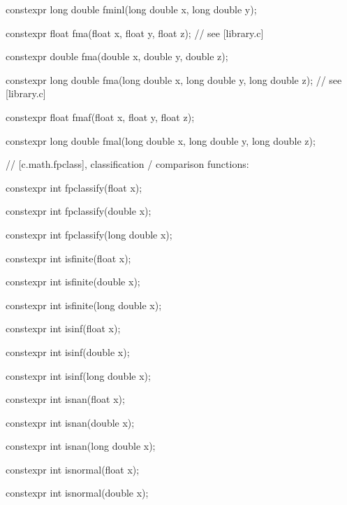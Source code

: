 \documentclass[prd,twocolumn,amsmath,amssymb,nofootinbib,eqsecnum]{revtex4-1}
\newcommand{\highlight}[1]{{\color{red} #1}}
\begin{document}
\begin{widetext}
{\highlight{constexpr} long double fminl(long double x, long double y);

\vspace{2ex}

\highlight{constexpr}  float fma(float x, float y, float z); // see [library.c]

\highlight{constexpr}  double fma(double x, double y, double z);

\highlight{constexpr}  long double fma(long double x, long double y, long double z); // see [library.c]

\highlight{constexpr}  float fmaf(float x, float y, float z);

\highlight{constexpr}  long double fmal(long double x, long double y, long double z);

\vspace{2ex}

// [c.math.fpclass], classification / comparison functions:

\highlight{constexpr} int fpclassify(float x);

\highlight{constexpr} int fpclassify(double x);

\highlight{constexpr} int fpclassify(long double x);

\vspace{2ex}

\highlight{constexpr} int isfinite(float x);

\highlight{constexpr} int isfinite(double x);

\highlight{constexpr} int isfinite(long double x);

\vspace{2ex}

\highlight{constexpr} int isinf(float x);

\highlight{constexpr} int isinf(double x);

\highlight{constexpr} int isinf(long double x);

\vspace{2ex}

\highlight{constexpr} int isnan(float x);

\highlight{constexpr} int isnan(double x);

\highlight{constexpr} int isnan(long double x);

\vspace{2ex}

\highlight{constexpr} int isnormal(float x);

\highlight{constexpr} int isnormal(double x);

}
\end{widetext}
\end{document}
